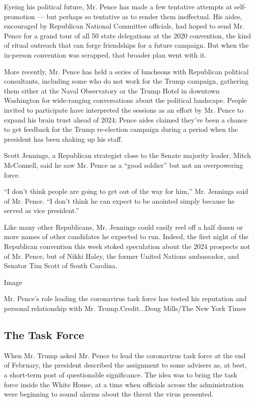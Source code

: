 Eyeing his political future, Mr. Pence has made a few tentative attempts
at self-promotion --- but perhaps so tentative as to render them
ineffectual. His aides, encouraged by Republican National Committee
officials, had hoped to send Mr. Pence for a grand tour of all 50 state
delegations at the 2020 convention, the kind of ritual outreach that can
forge friendships for a future campaign. But when the in-person
convention was scrapped, that broader plan went with it.

More recently, Mr. Pence has held a series of luncheons with Republican
political consultants, including some who do not work for the Trump
campaign, gathering them either at the Naval Observatory or the Trump
Hotel in downtown Washington for wide-ranging conversations about the
political landscape. People invited to participate have interpreted the
sessions as an effort by Mr. Pence to expand his brain trust ahead of
2024; Pence aides claimed they've been a chance to get feedback for the
Trump re-election campaign during a period when the president has been
shaking up his staff.

Scott Jennings, a Republican strategist close to the Senate majority
leader, Mitch McConnell, said he saw Mr. Pence as a ``good soldier'' but
not an overpowering force.

``I don't think people are going to get out of the way for him,'' Mr.
Jennings said of Mr. Pence. ``I don't think he can expect to be anointed
simply because he served as vice president.''

Like many other Republicans, Mr. Jennings could easily reel off a half
dozen or more names of other candidates he expected to run. Indeed, the
first night of the Republican convention this week stoked speculation
about the 2024 prospects not of Mr. Pence, but of Nikki Haley, the
former United Nations ambassador, and Senator Tim Scott of South
Carolina.

Image

Mr. Pence's role leading the coronavirus task force has tested his
reputation and personal relationship with Mr. Trump.Credit...Doug
Mills/The New York Times

\hypertarget{the-task-force}{%
\subsection{The Task Force}\label{the-task-force}}

When Mr. Trump asked Mr. Pence to lead the coronavirus task force at the
end of February, the president described the assignment to some advisers
as, at best, a short-term post of questionable significance. The idea
was to bring the task force inside the White House, at a time when
officials across the administration were beginning to sound alarms about
the threat the virus presented.


